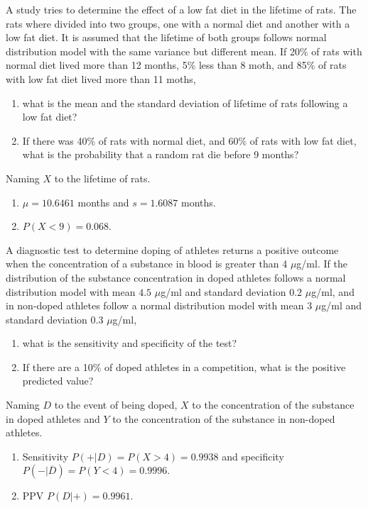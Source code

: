 {A study tries to determine the effect of a low fat diet in the lifetime of rats.
The rats where divided into two groups, one with a normal diet and another with a low fat diet.
It is assumed that the lifetime of both groups follows normal distribution model with the same variance but different
mean.
If 20\% of rats with normal diet lived more than 12 months, 5\% less than 8 moth, and 85\% of rats with low fat diet
lived more than 11 moths,
\begin{enumerate}
\item what is the mean and the standard deviation of lifetime of rats following a low fat diet?
\item If there was 40\% of rats with normal diet, and 60\% of rats with low fat diet, what is the probability that a
random rat die before 9 months?
\end{enumerate}
}
{Naming $X$ to the lifetime of rats. 
\begin{enumerate}
\item $\mu=10.6461$ months and $s=1.6087$ months. 
\item $P(X<9)=0.068$.
\end{enumerate}
}
{}


{A diagnostic test to determine doping of athletes returns a positive outcome when the concentration of a substance
in blood is greater than 4 $\mu$g/ml.
If the distribution of the substance concentration in doped athletes follows a normal distribution model with mean $4.5$
$\mu$g/ml and standard deviation $0.2$ $\mu$g/ml, and in non-doped athletes follow a normal distribution model with mean
$3$ $\mu$g/ml and standard deviation $0.3$ $\mu$g/ml, 
\begin{enumerate}
\item what is the sensitivity and specificity of the test?
\item If there are a 10\% of doped athletes in a competition, what is the positive predicted value? 
\end{enumerate}
}
{Naming $D$ to the event of being doped, $X$ to the concentration of the substance in doped athletes and $Y$ to the concentration of the substance in non-doped athletes.
\begin{enumerate}
\item Sensitivity $P(+|D)=P(X>4)=0.9938$ and specificity $P(-|\overline D)=P(Y<4)=0.9996$.
\item PPV $P(D|+)=0.9961$.
\end{enumerate}
}
{}